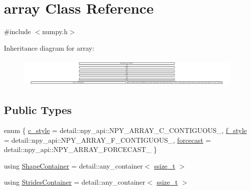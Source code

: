 \hypertarget{classarray}{}\section{array Class Reference}
\label{classarray}


{\ttfamily \#include $<$numpy.\+h$>$}

Inheritance diagram for array\+:\begin{figure}[H]
\begin{center}
\leavevmode
\includegraphics[height=1.452031cm]{classarray}
\end{center}
\end{figure}
\subsection*{Public Types}
\begin{DoxyCompactItemize}
\item 
enum \{ \mbox{\hyperlink{classarray_af40deff69606a75cf645863432967ba7acaa99b2eea8427713331c18117d633d3}{c\+\_\+style}} = detail\+::npy\+\_\+api\+::N\+P\+Y\+\_\+\+A\+R\+R\+A\+Y\+\_\+\+C\+\_\+\+C\+O\+N\+T\+I\+G\+U\+O\+U\+S\+\_\+, 
\mbox{\hyperlink{classarray_af40deff69606a75cf645863432967ba7a184167ee839296f10d5c04c1480736bd}{f\+\_\+style}} = detail\+::npy\+\_\+api\+::N\+P\+Y\+\_\+\+A\+R\+R\+A\+Y\+\_\+\+F\+\_\+\+C\+O\+N\+T\+I\+G\+U\+O\+U\+S\+\_\+, 
\mbox{\hyperlink{classarray_af40deff69606a75cf645863432967ba7a2886e477a3f6090266168e82d389adc1}{forcecast}} = detail\+::npy\+\_\+api\+::N\+P\+Y\+\_\+\+A\+R\+R\+A\+Y\+\_\+\+F\+O\+R\+C\+E\+C\+A\+S\+T\+\_\+
 \}
\item 
using \mbox{\hyperlink{classarray_a3378d7821106645fa3a88c5222e127e0}{Shape\+Container}} = detail\+::any\+\_\+container$<$ \mbox{\hyperlink{detail_2common_8h_ac430d16fc097b3bf0a7469cfd09decda}{ssize\+\_\+t}} $>$
\item 
using \mbox{\hyperlink{classarray_a8ba4f30946f0bc69ec937160c9fb10e1}{Strides\+Container}} = detail\+::any\+\_\+container$<$ \mbox{\hyperlink{detail_2common_8h_ac430d16fc097b3bf0a7469cfd09decda}{ssize\+\_\+t}} $>$
\end{DoxyCompactItemize}
